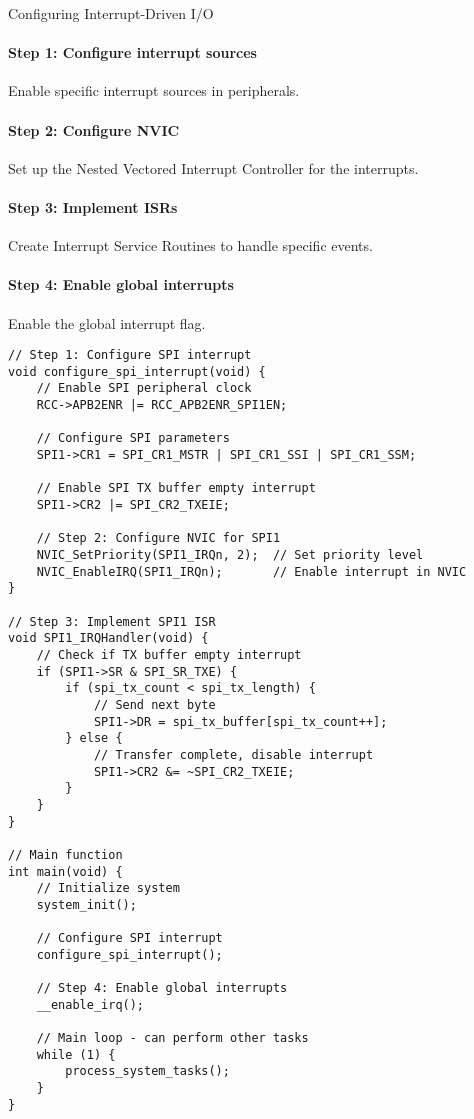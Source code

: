 \begin{KR}{Configuring Interrupt-Driven I/O}\\
\paragraph{Step 1: Configure interrupt sources}
Enable specific interrupt sources in peripherals.
\paragraph{Step 2: Configure NVIC}
Set up the Nested Vectored Interrupt Controller for the interrupts.
\paragraph{Step 3: Implement ISRs}
Create Interrupt Service Routines to handle specific events.
\paragraph{Step 4: Enable global interrupts}
Enable the global interrupt flag.

\begin{lstlisting}[style=basesmol]
// Step 1: Configure SPI interrupt
void configure_spi_interrupt(void) {
    // Enable SPI peripheral clock
    RCC->APB2ENR |= RCC_APB2ENR_SPI1EN;
    
    // Configure SPI parameters
    SPI1->CR1 = SPI_CR1_MSTR | SPI_CR1_SSI | SPI_CR1_SSM;
    
    // Enable SPI TX buffer empty interrupt
    SPI1->CR2 |= SPI_CR2_TXEIE;
    
    // Step 2: Configure NVIC for SPI1
    NVIC_SetPriority(SPI1_IRQn, 2);  // Set priority level
    NVIC_EnableIRQ(SPI1_IRQn);       // Enable interrupt in NVIC
}

// Step 3: Implement SPI1 ISR
void SPI1_IRQHandler(void) {
    // Check if TX buffer empty interrupt
    if (SPI1->SR & SPI_SR_TXE) {
        if (spi_tx_count < spi_tx_length) {
            // Send next byte
            SPI1->DR = spi_tx_buffer[spi_tx_count++];
        } else {
            // Transfer complete, disable interrupt
            SPI1->CR2 &= ~SPI_CR2_TXEIE;
        }
    }
}

// Main function
int main(void) {
    // Initialize system
    system_init();
    
    // Configure SPI interrupt
    configure_spi_interrupt();
    
    // Step 4: Enable global interrupts
    __enable_irq();
    
    // Main loop - can perform other tasks
    while (1) {
        process_system_tasks();
    }
}
\end{lstlisting}
\end{KR}

